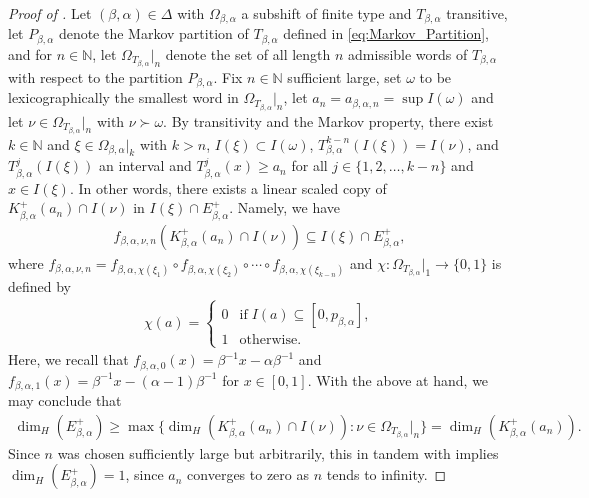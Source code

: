 \documentclass[a4paper,reqno,10pt]{amsart}
\begin{document}
\begin{proof}[Proof of \texorpdfstring{}{Corollary 1.5}]
Let $(\beta, \alpha) \in \Delta$ with $\Omega_{\beta,\alpha}$ a subshift of finite type and $T_{\beta,\alpha}$ transitive, let $P_{\beta,\alpha}$ denote the Markov partition of $T_{\beta,\alpha}$ defined in \eqref{eq:Markov_Partition}, and for $n\in \mathbb{N}$, let $\Omega_{T_{\beta,\alpha}}\vert_{n}$ denote the set of all length $n$ admissible words of $T_{\beta,\alpha}$ with respect to the partition $P_{\beta,\alpha}$.  Fix $n \in \mathbb{N}$ sufficient large, set $\omega$ to be lexicographically the smallest word in $\Omega_{T_{\beta,\alpha}}\vert_{n}$, let $a_{n} = a_{\beta, \alpha, n} = \sup I(\omega)$ and let $\nu \in \Omega_{T_{\beta,\alpha}}\vert_{n}$ with $\nu \succ \omega$. By transitivity and the Markov property, there exist $k \in \mathbb{N}$ and $\xi \in \Omega_{\beta,\alpha}\vert_{k}$ with $k > n$, $I(\xi) \subset I(\omega)$, $T_{\beta,\alpha}^{k-n}(I(\xi)) = I(\nu)$, and $T_{\beta,\alpha}^j(I(\xi))$ an interval and $T_{\beta,\alpha}^{j}(x) \geq a_{n}$ for all $j \in \{1,2, \dots, k - n\}$ and $x \in I(\xi)$.  In other words, there exists a linear scaled copy of $K_{\beta,\alpha}^{+}(a_{n}) \cap I(\nu)$ in $I(\xi) \cap E_{\beta,\alpha}^{+}$.   Namely, we have
    \begin{align}\label{eq:scaling_func}
        f_{\beta,\alpha,\nu,n}(K_{\beta,\alpha}^{+}(a_{n}) \cap I(\nu)) \subseteq I(\xi) \cap E_{\beta,\alpha}^{+},
    \end{align}
where $f_{\beta, \alpha,\nu, n} = f_{\beta,\alpha,\chi(\xi_{1})} \circ f_{\beta,\alpha,\chi(\xi_{2})} \circ \cdots \circ f_{\beta,\alpha,\chi(\xi_{k-n})}$ and $\chi \colon \Omega_{T_{\beta,\alpha}}\vert_{1} \to \{ 0, 1\}$ is defined by
    \begin{align*}
        \chi(a) = \begin{cases}
            0 & \text{if} \; I(a) \subseteq [0, p_{\beta,\alpha}],\\
            1 & \text{otherwise.}
        \end{cases}
    \end{align*}
Here, we recall that $f_{\beta,\alpha,0}(x) = \beta^{-1}x-\alpha\beta^{-1}$ and $f_{\beta,\alpha, 1}(x) = \beta^{-1}x-(\alpha-1)\beta^{-1}$ for $x \in [0,1]$. With the above at hand, we may conclude that
    \begin{align*}
        \dim_H (E_{\beta,\alpha}^{+})
        \geq \max \{ \dim_H(K_{\beta,\alpha}^{+}(a_{n}) \cap I(\nu)) \colon \nu \in \Omega_{T_{\beta,\alpha}}\vert_{n} \}
        = \dim_H(K_{\beta,\alpha}^{+}(a_{n})).
    \end{align*}
Since $n$ was chosen sufficiently large but arbitrarily, this in tandem with  implies $\dim_H (E_{\beta,\alpha}^{+}) = 1$, since $a_n$ converges to zero as $n$ tends to infinity.  


\end{proof}
\end{document}
